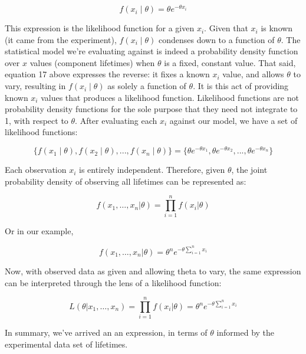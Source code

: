 \documentclass[12pt]{article}
\begin{document}
\begin{equation}
 f(x_i \mid \theta) = \theta e^{-\theta x_i}
\end{equation}

\noindent This expression is the likelihood function for a given $x_i$. Given that $x_i$ is known (it came from the experiment), $f(x_i \mid \theta)$ condenses down to a function of $\theta$. The statistical model we're evaluating against is indeed a probability density function over $x$ values (component lifetimes) when $\theta$ is a fixed, constant value. That said, equation 17 above expresses the reverse: it fixes a known $x_i$ value, and allows $\theta$ to vary, resulting in $f(x_i \mid \theta)$ as solely a function of $\theta$. It is this act of providing known $x_i$ values that produces a likelihood function. Likelihood functions are not probability density functions for the sole purpose that they need not integrate to 1, with respect to $\theta$. After evaluating each $x_i$ against our model, we have a set of likelihood functions:

\begin{equation}
\{f(x_1 \mid \theta), f(x_2 \mid \theta), ..., f(x_n \mid \theta)\} = \{\theta e^{-\theta x_1}, \theta e^{-\theta x_2}, ..., \theta e^{-\theta x_n}\}
\end{equation}

\noindent Each observation $x_i$ is entirely independent. Therefore, given $\theta$, the joint probability density of observing all lifetimes can be represented as:

\begin{equation}
f(x_1, \ldots, x_n|\theta) = \prod_{i=1}^n f(x_i|\theta)
\end{equation}

\noindent Or in our example,

\begin{equation}
f(x_1, \ldots, x_n|\theta) = \theta^n e^{-\theta \sum_{i=1}^n x_i}
\end{equation}

\noindent Now, with observed data as given and allowing theta to vary, the same expression can be interpreted through the lens of a likelihood function:

\begin{equation}
L(\theta | x_1, \ldots, x_n) = \prod_{i=1}^n f(x_i|\theta) = \theta^n e^{-\theta \sum_{i=1}^n x_i}
\end{equation}

\noindent In summary, we've arrived an an expression, in terms of $\theta$ informed by the experimental data set of lifetimes.
\end{document}
